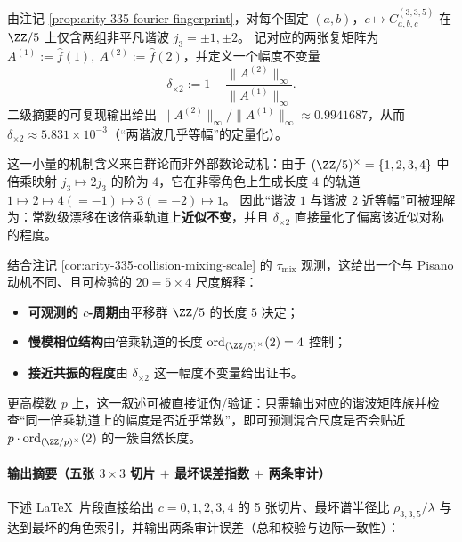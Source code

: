 \begin{remark}\label{rem:arity-335-mult-orbit-20-scale}
由注记 \ref{prop:arity-335-fourier-fingerprint}，对每个固定 \((a,b)\)，\(c\mapsto C^{(3,3,5)}_{a,b,c}\) 在 \(\ZZ/5\) 上仅含两组非平凡谐波 \(j_3=\pm 1,\pm 2\)。
记对应的两张复矩阵为
\(
A^{(1)}:=\widehat f(1),\ A^{(2)}:=\widehat f(2)
\)，并定义一个幅度不变量
\[
\delta_{\times 2}
:=
1-\frac{\|A^{(2)}\|_\infty}{\|A^{(1)}\|_\infty}.
\]
二级摘要的可复现输出给出
\(
\|A^{(2)}\|_\infty/\|A^{(1)}\|_\infty\approx 0.9941687
\)，从而 \(\delta_{\times 2}\approx 5.831\times 10^{-3}\)（“两谐波几乎等幅”的定量化）。
\par
这一小量的机制含义来自群论而非外部数论动机：由于 \((\ZZ/5)^\times=\{1,2,3,4\}\) 中倍乘映射 \(j_3\mapsto 2j_3\) 的阶为 \(4\)，它在非零角色上生成长度 \(4\) 的轨道
\(
1\mapsto 2\mapsto 4(=-1)\mapsto 3(=-2)\mapsto 1
\)。
因此“谐波 \(1\) 与谐波 \(2\) 近等幅”可被理解为：常数级漂移在该倍乘轨道上\textbf{近似不变}，并且 \(\delta_{\times 2}\) 直接量化了偏离该近似对称的程度。
\par
结合注记 \ref{cor:arity-335-collision-mixing-scale} 的 \(\tau_{\mathrm{mix}}\) 观测，这给出一个与 Pisano 动机不同、且可检验的 \(20=5\times 4\) 尺度解释：
\begin{itemize}
  \item \textbf{可观测的 \(c\)-周期}由平移群 \(\ZZ/5\) 的长度 \(5\) 决定；
  \item \textbf{慢模相位结构}由倍乘轨道的长度 \(\mathrm{ord}_{(\ZZ/5)^\times}(2)=4\) 控制；
  \item \textbf{接近共振的程度}由 \(\delta_{\times 2}\) 这一幅度不变量给出证书。
\end{itemize}
更高模数 \(p\) 上，这一叙述可被直接证伪/验证：只需输出对应的谐波矩阵族并检查“同一倍乘轨道上的幅度是否近乎常数”，即可预测混合尺度是否会贴近 \(p\cdot \mathrm{ord}_{(\ZZ/p)^\times}(2)\) 的一簇自然长度。
\end{remark}

\paragraph{输出摘要（五张 \texorpdfstring{$3\times 3$}{3x3} 切片 \texorpdfstring{$+$}{+} 最坏误差指数 \texorpdfstring{$+$}{+} 两条审计）}
下述 \LaTeX\ 片段直接给出 $c=0,1,2,3,4$ 的 5 张切片、最坏谱半径比 $\rho_{3,3,5}/\lambda$ 与达到最坏的角色索引，并输出两条审计误差（总和校验与边际一致性）：
